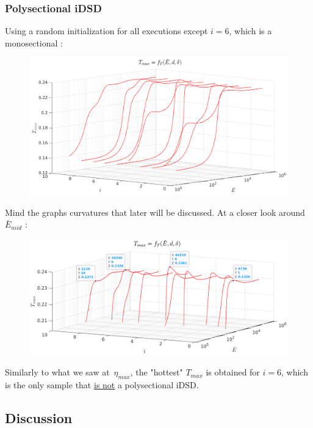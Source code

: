 \documentclass[12pt]{article}
\numberwithin{equation}{section}
\begin{document}
\begin{flushleft}
\subsubsection*{Polysectional iDSD}
Using a random initialization for all executions except $i=6$, which is a monosectional :
\begin{figure}[H] 
\centering
\includegraphics[width=1.04 \linewidth, center]{T_max_full_d.png}
\end{figure}
Mind the graphs curvatures that later will be discussed. At a closer look around $\bar{E}_{mid}$ :
\begin{figure}[H] 
\centering
\includegraphics[width=1.04 \linewidth, center]{T_max_full_e.png}
\end{figure}
Similarly to what we saw at \,$\eta_{max}$, the "hottest" $T_{max}$ is obtained for $i=6$, which is the only sample that \underline{is not} a polysectional iDSD.

\subsection{Discussion}


\end{flushleft}
\end{document}
